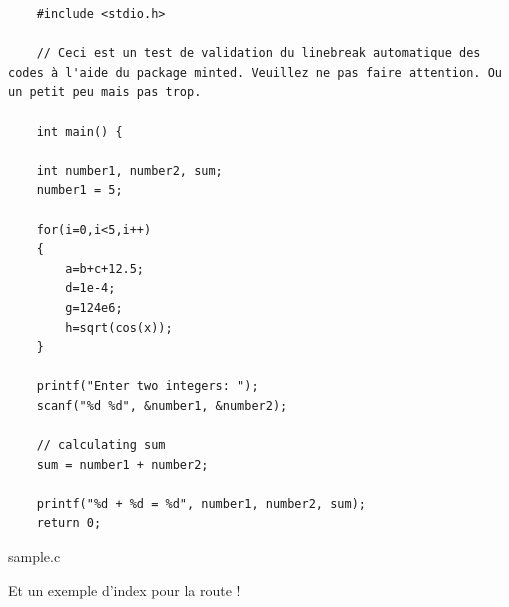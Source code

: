 \documentclass[a4paper,11pt]{report}    %
\begin{document}
\begin{listing}[H]
\begin{verbatim}
    #include <stdio.h>

    // Ceci est un test de validation du linebreak automatique des codes à l'aide du package minted. Veuillez ne pas faire attention. Ou un petit peu mais pas trop.

    int main() {

    int number1, number2, sum;
    number1 = 5;

    for(i=0,i<5,i++)
    {
        a=b+c+12.5;
        d=1e-4;
        g=124e6;
        h=sqrt(cos(x));
    }

    printf("Enter two integers: ");
    scanf("%d %d", &number1, &number2);

    // calculating sum
    sum = number1 + number2;

    printf("%d + %d = %d", number1, number2, sum);
    return 0;
\end{verbatim}
\caption{sample.c}
\label{lst:sample.c}
\end{listing}

Et un exemple d'index pour la route !



\newpage
\listoffigures

\newpage
\listoftables

\newpage
\listofmyequations

\newpage
\listoflistings

\newpage
\printindex

\newpage
\printbibliography[heading=bibintoc]


\end{document}

